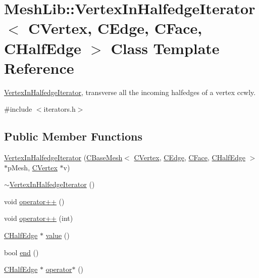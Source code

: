 \hypertarget{class_mesh_lib_1_1_vertex_in_halfedge_iterator}{}\section{Mesh\+Lib\+:\+:Vertex\+In\+Halfedge\+Iterator$<$ C\+Vertex, C\+Edge, C\+Face, C\+Half\+Edge $>$ Class Template Reference}
\label{class_mesh_lib_1_1_vertex_in_halfedge_iterator}


\hyperlink{class_mesh_lib_1_1_vertex_in_halfedge_iterator}{Vertex\+In\+Halfedge\+Iterator}, transverse all the incoming halfedges of a vertex ccwly.  




{\ttfamily \#include $<$iterators.\+h$>$}

\subsection*{Public Member Functions}
\begin{DoxyCompactItemize}
\item 
\hyperlink{class_mesh_lib_1_1_vertex_in_halfedge_iterator_a97fe9e495df1838bd1d3b65b19a733d2}{Vertex\+In\+Halfedge\+Iterator} (\hyperlink{class_mesh_lib_1_1_c_base_mesh}{C\+Base\+Mesh}$<$ \hyperlink{class_mesh_lib_1_1_c_vertex}{C\+Vertex}, \hyperlink{class_mesh_lib_1_1_c_edge}{C\+Edge}, \hyperlink{class_mesh_lib_1_1_c_face}{C\+Face}, \hyperlink{class_mesh_lib_1_1_c_half_edge}{C\+Half\+Edge} $>$ $\ast$p\+Mesh, \hyperlink{class_mesh_lib_1_1_c_vertex}{C\+Vertex} $\ast$v)
\item 
\hyperlink{class_mesh_lib_1_1_vertex_in_halfedge_iterator_a8199a01c8990c6188c292e98129e93cd}{$\sim$\+Vertex\+In\+Halfedge\+Iterator} ()
\item 
void \hyperlink{class_mesh_lib_1_1_vertex_in_halfedge_iterator_a1f945b1fc9b3b0b367e535a2f0075d0d}{operator++} ()
\item 
void \hyperlink{class_mesh_lib_1_1_vertex_in_halfedge_iterator_ad578fa12f770dda7bc2b2889a8f20061}{operator++} (int)
\item 
\hyperlink{class_mesh_lib_1_1_c_half_edge}{C\+Half\+Edge} $\ast$ \hyperlink{class_mesh_lib_1_1_vertex_in_halfedge_iterator_ad3fdaf0a91faf593c7f78e0cf2fd22ac}{value} ()
\item 
bool \hyperlink{class_mesh_lib_1_1_vertex_in_halfedge_iterator_ad391de8757ca6852b62cbba3032d2cc4}{end} ()
\item 
\hyperlink{class_mesh_lib_1_1_c_half_edge}{C\+Half\+Edge} $\ast$ \hyperlink{class_mesh_lib_1_1_vertex_in_halfedge_iterator_aa7f4149e715618aa2499ad8c89f902fa}{operator$\ast$} ()
\end{DoxyCompactItemize}


